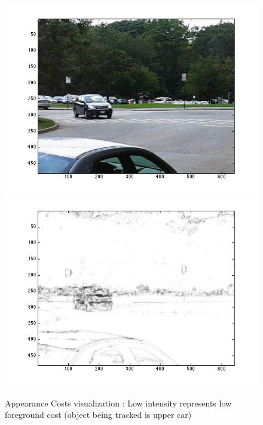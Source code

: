 \begin{figure}[t]
\begin{centering}
\includegraphics[scale=0.4]{figures/UnaryCostGT}\includegraphics[scale=0.4]{figures/UnaryCost}\caption{Appearance Costs visualization : Low intensity represents low foreground cost
(object being tracked is upper car)}
\par\end{centering}
\end{figure}

